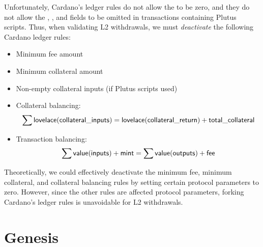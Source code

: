 \documentclass[../hydrozoa.tex]{subfiles}
\begin{document}
Unfortunately, Cardano's ledger rules do not allow the  to be zero, and they do not allow the , , and  fields to be omitted in transactions containing Plutus scripts.
Thus, when validating L2 withdrawals, we must \emph{deactivate} the following Cardano ledger rules:
\begin{itemize}
  \item Minimum fee amount
  \item Minimum collateral amount
  \item Non-empty collateral inputs (if Plutus scripts used)
  \item Collateral balancing:
    \begin{equation*}
      \sum \mathsf{lovelace} (\mathsf{collateral\_inputs}) =
      \mathsf{lovelace} (\mathsf{collateral\_return}) + \mathsf{total\_collateral}
    \end{equation*}
  \item Transaction balancing:
    \begin{equation*}
      \sum \mathsf{value} (\mathsf{inputs}) + \mathsf{mint} =
      \sum \mathsf{value} (\mathsf{outputs}) + \mathsf{fee}
    \end{equation*}
\end{itemize}

Theoretically, we could effectively deactivate the minimum fee, minimum collateral, and collateral balancing rules by setting certain protocol parameters to zero.
However, since the other rules are affected protocol parameters, forking Cardano's ledger rules is unavoidable for L2 withdrawals.

\section{Genesis}%
\label{h:ledger-genesis}%
\end{document}
